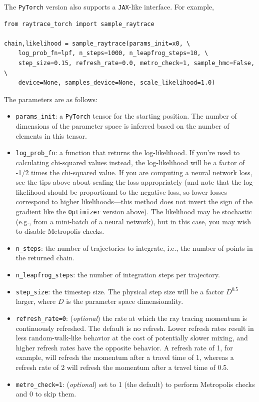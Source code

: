 \documentclass[12pt]{article}
\begin{document}
The \texttt{PyTorch} version also supports a \texttt{JAX}-like interface.  For example, 
\begin{lstlisting}
from raytrace_torch import sample_raytrace

chain,likelihood = sample_raytrace(params_init=x0, \
    log_prob_fn=lpf, n_steps=1000, n_leapfrog_steps=10, \
    step_size=0.15, refresh_rate=0.0, metro_check=1, sample_hmc=False, \
    device=None, samples_device=None, scale_likelihood=1.0)
\end{lstlisting}
The parameters are as follows:
\begin{itemize}
\item \lstinline{params_init}: a \texttt{PyTorch} tensor for the starting position.  The number of dimensions of the parameter space is inferred based on the number of elements in this tensor.
\item \lstinline{log_prob_fn}: a function that returns the log-likelihood.  If you're used to calculating chi-squared values instead, the log-likelihood will be a factor of -1/2 times the chi-squared value.  If you are computing a neural network loss, see the tips above about scaling the loss appropriately (and note that the log-likelihood should be proportional to the negative loss, so lower losses correspond to higher likelihoods---this method does not invert the sign of the gradient like the \texttt{Optimizer} version above).  The likelihood may be stochastic (e.g., from a mini-batch of a neural network), but in this case, you may wish to disable Metropolis checks.
\item \lstinline{n_steps}: the number of trajectories to integrate, i.e., the number of points in the returned chain.
\item \lstinline{n_leapfrog_steps}: the number of integration steps per trajectory.
\item \lstinline{step_size}: the timestep size.  The physical step size will be a factor $D^{0.5}$ larger, where $D$ is the parameter space dimensionality.
\item \lstinline{refresh_rate=0}: (\textit{optional}) the rate at which the ray tracing momentum is continuously refreshed.  The default is no refresh.  Lower refresh rates result in less random-walk-like behavior at the cost of potentially slower mixing, and higher refresh rates have the opposite behavior.  A refresh rate of 1, for example, will refresh the momentum after a travel time of 1, whereas a refresh rate of 2 will refresh the momentum after a travel time of 0.5.
\item \lstinline{metro_check=1}: (\textit{optional}) set to 1 (the default) to perform Metropolis checks and 0 to skip them.  

\end{itemize}
\end{document}
